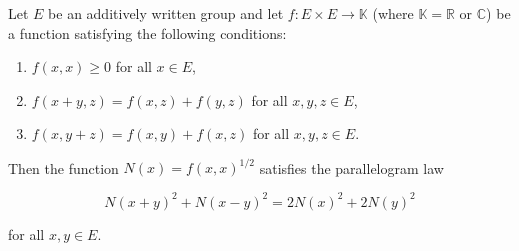 Let $E$ be an additively written group and let $f \colon E \times E \to \mathbb{K}$ (where $\mathbb{K} = \mathbb{R}$ or $\mathbb{C}$) be a function satisfying the following conditions:

\begin{enumerate}
\item[(i)] $f(x, x) \geq 0$ for all $x \in E$,
\item[(ii)] $f(x + y, z) = f(x, z) + f(y, z)$ for all $x, y, z \in E$,
\item[(iii)] $f(x, y + z) = f(x, y) + f(x, z)$ for all $x, y, z \in E$.
\end{enumerate}

Then the function $N(x) = f(x, x)^{1/2}$ satisfies the parallelogram law

$$N(x + y)^2 + N(x - y)^2 = 2N(x)^2 + 2N(y)^2$$

for all $x, y \in E$.
